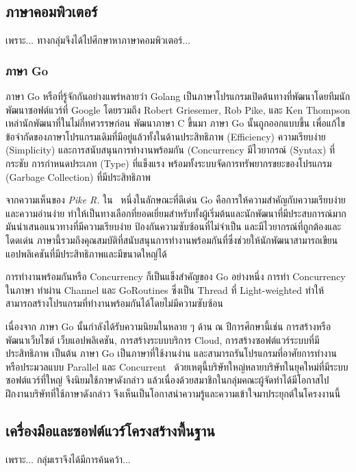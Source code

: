 \documentclass[12pt,one side,openright,a4paper]{cpe-thesis-th}
\newcommand{\thaijustify}[1]{%
  \par\hspace{30pt}\justifying
  #1
}
\begin{document}
    \subsection{ภาษาคอมพิวเตอร์}
        \thaijustify{
            เพราะ... ทางกลุ่มจึงได้ไปศึกษาหาภาษาคอมพิวเตอร์...
        }
        \subsubsection{ภาษา Go}
            \thaijustify{
                ภาษา Go หรือที่รู้จักกันอย่างแพร่หลายว่า Golang เป็นภาษาโปรแกรมเปิดต้นทางที่พัฒนาโดยทีมนักพัฒนาซอฟต์แวร์ที่ Google โดยรวมถึง Robert Griesemer, Rob Pike, และ Ken Thompson เหล่านักพัฒนาที่ในไม่กี่ทศวรรษก่อน พัฒนาภาษา C ขึ้นมา ภาษา Go นั้นถูกออกแบบขึ้น เพื่อแก้ไขข้อจำกัดของภาษาโปรแกรมเดิมที่มีอยู่แล้วทั้งในด้านประสิทธิภาพ (Efficiency) ความเรียบง่าย (Simplicity) และการสนับสนุนการทำงานพร้อมกัน (Concurrency มีไวยากรณ์ (Syntax) ที่กระชับ การกำหนดประเภท (Type) ที่แข็งแรง พร้อมทั้งระบบจัดการทรัพยากรขยะของโปรแกรม (Garbage Collection) ที่มีประสิทธิภาพ~\cite{pike12go, donovan15go}
            }
            \thaijustify{
                จากความเห็นของ \textit{Pike R.} ใน~\cite{pike12go, pike12godev} หนึ่งในลักษณะที่ดีเด่น Go คือการให้ความสำคัญกับความเรียบง่ายและความอ่านง่าย ทำให้เป็นทางเลือกที่ยอดเยี่ยมสำหรับทั้งผู้เริ่มต้นและนักพัฒนาที่มีประสบการณ์มาก มันนำเสนอแนวทางที่มีความเรียบง่าย ป้องกันความซับซ้อนที่ไม่จำเป็น และมีไวยากรณ์ที่ถูกต้องและโดดเด่น ภาษานี้รวมถึงคุณสมบัติที่สนับสนุนการทำงานพร้อมกันที่ซึ่งช่วยให้นักพัฒนาสามารถเขียนแอปพลิเคชันที่มีประสิทธิภาพและมีขนาดใหญ่ได้
            }
            \thaijustify{
                การทำงานพร้อมกันหรือ Concurrency ก็เป็นแข็งสำคัญของ Go อย่างหนึ่ง การทำ Concurrency ในภาษา ทำผ่าน Channel และ GoRoutines ซึ่งเป็น Thread ที่ Light-weighted ทำให้สามารถสร้างโปรแกรมที่ทำงานพร้อมกันได้โดยไม่มีความซับซ้อน~\cite{donovan15go}
            }
            \thaijustify{
                เนื่องจาก ภาษา Go นั้นกำลังได้รับความนิยมในหลาย ๆ ด้าน ณ ปีการศึกษานี้เช่น การสร้างหรือพัฒนาเว็บไซต์ เว็บแอปพลิเคชัน, การสร้างระบบบริการ Cloud, การสร้างซอฟต์แวร์ระบบที่มีประสิทธิภาพ เป็นต้น ภาษา Go เป็นภาษาที่ใช้งานง่าน และสามารถรันโปรแกรมที่อาศัยการทำงานหรือประมวลแบบ Parallel และ Concurrent~\cite{golangorg} ด้วยเหตุนี้บริษัทใหญ่หลายบริษัทในยุคใหม่ที่มีระบบซอฟต์แวร์ที่ใหญ่ จึงนิยมใช้ภาษาดังกล่าว แล้วเนื่องด้วยสมาชิกในกลุ่มคณะผู้จัดทำได้มีโอกาสไปฝึกงานบริษัทที่ใช้ภาษาดังกล่าว จึงเห็นเป็นโอกาสนำความรู้และความเข้าใจมาประยุกต์ในโครงงานนี้
            }
    \subsection{เครื่องมือและซอฟต์แวร์โครงสร้างพื้นฐาน}
        เพราะ... กลุ่มเราจึงได้มีการค้นคว้า...
\end{document}
